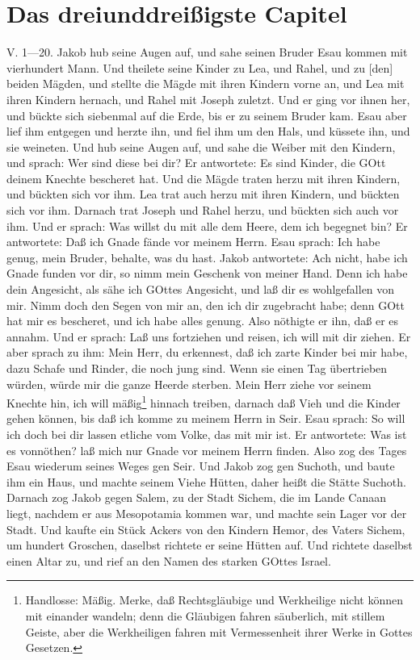\section{Das dreiunddreißigste Capitel}
\begin{schriftzitat}
V. 1—20. Jakob hub seine Augen auf, und sahe seinen Bruder Esau kommen mit vierhundert Mann. Und theilete seine Kinder zu Lea, und Rahel, und zu [den] beiden Mägden, und stellte die Mägde mit ihren Kindern vorne an, und Lea mit ihren Kindern hernach, und Rahel mit Joseph zuletzt. Und er ging vor ihnen her, und bückte sich siebenmal auf die Erde, bis er zu seinem Bruder kam. Esau aber lief ihm entgegen und herzte ihn, und fiel ihm um den Hals, und küssete ihn, und sie weineten. Und hub seine Augen auf, und sahe die Weiber mit den Kindern, und sprach: Wer sind diese bei dir? Er antwortete: Es sind Kinder, die GOtt deinem Knechte bescheret hat. Und die Mägde traten herzu mit ihren Kindern, und bückten sich vor ihm. Lea trat auch herzu mit ihren Kindern, und bückten sich vor ihm. Darnach trat Joseph und Rahel herzu, und bückten sich auch vor ihm. Und er sprach: Was willst du mit alle dem Heere, dem ich begegnet bin? Er antwortete: Daß ich Gnade fände vor meinem Herrn. Esau sprach: Ich habe genug, mein Bruder, behalte, was du hast. Jakob antwortete: Ach nicht, habe ich Gnade funden vor dir, so nimm mein Geschenk von meiner Hand. Denn ich habe dein Angesicht, als sähe ich GOttes Angesicht, und laß dir es wohlgefallen von mir. Nimm doch den Segen von mir an, den ich dir zugebracht habe; denn GOtt hat mir es bescheret, und ich habe alles genung. Also nöthigte er ihn, daß er es annahm. Und er sprach: Laß uns fortziehen und reisen, ich will mit dir ziehen. Er aber sprach zu ihm: Mein Herr, du erkennest, daß ich zarte Kinder bei mir habe, dazu Schafe und Rinder, die noch jung sind. Wenn sie einen Tag übertrieben würden, würde mir die ganze Heerde sterben. Mein Herr ziehe vor seinem Knechte hin, ich will mäßig\footnote{Handlosse: Mäßig. Merke, daß Rechtsgläubige und Werkheilige nicht können mit einander wandeln; denn die Gläubigen fahren säuberlich, mit stillem Geiste, aber die Werkheiligen fahren mit Vermessenheit ihrer Werke in Gottes Gesetzen.} hinnach treiben, darnach daß Vieh und die Kinder gehen können, bis daß ich komme zu meinem Herrn in Seir. Esau sprach: So will ich doch bei dir lassen etliche vom Volke,
das mit mir ist. Er antwortete: Was ist es vonnöthen? laß mich nur Gnade vor meinem Herrn finden. Also zog des Tages Esau wiederum seines Weges gen Seir. Und Jakob zog gen Suchoth, und baute ihm ein Haus, und machte seinem Viehe Hütten, daher heißt die Stätte Suchoth. Darnach zog Jakob gegen Salem, zu der Stadt Sichem, die im Lande Canaan liegt, nachdem er aus Mesopotamia kommen war, und machte sein Lager vor der Stadt. Und kaufte ein Stück Ackers von den Kindern Hemor, des Vaters Sichem, um hundert Groschen, daselbst richtete er seine Hütten auf. Und richtete daselbst einen Altar zu, und rief an den Namen des starken GOttes Israel.
\end{schriftzitat}

